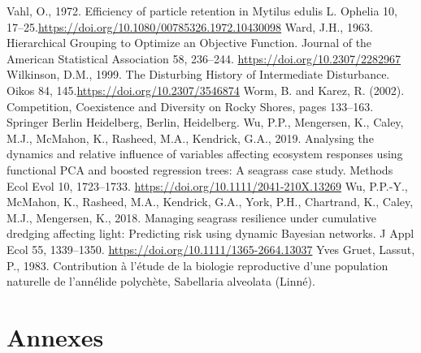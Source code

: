 \documentclass[12pt]{report}
\begin{document}
\begin{singlespacing}
\newline\newline
Vahl, O., 1972. Efficiency of particle retention in Mytilus edulis L. Ophelia 10, 17–25.\newline \href{https://doi.org/10.1080/00785326.1972.10430098}{https://doi.org/10.1080/00785326.1972.10430098}
\newline\newline
Ward, J.H., 1963. Hierarchical Grouping to Optimize an Objective Function. Journal of the American Statistical Association 58, 236–244. \href{https://doi.org/10.2307/2282967}{https://doi.org/10.2307/2282967}
\newline\newline
Wilkinson, D.M., 1999. The Disturbing History of Intermediate Disturbance. Oikos 84, 145.\newline \href{https://doi.org/10.2307/3546874}{https://doi.org/10.2307/3546874}
\newline\newline
Worm, B. and Karez, R. (2002). Competition, Coexistence and Diversity on Rocky Shores, pages 133–163. Springer Berlin Heidelberg, Berlin, Heidelberg.
\newline\newline
Wu, P.P., Mengersen, K., Caley, M.J., McMahon, K., Rasheed, M.A., Kendrick, G.A., 2019. Analysing the dynamics and relative influence of variables affecting ecosystem responses using functional PCA and boosted regression trees: A seagrass case study. Methods Ecol Evol 10, 1723–1733. \href{https://doi.org/10.1111/2041-210X.13269}{https://doi.org/10.1111/2041-210X.13269}
\newline\newline
Wu, P.P.-Y., McMahon, K., Rasheed, M.A., Kendrick, G.A., York, P.H., Chartrand, K., Caley, M.J., Mengersen, K., 2018. Managing seagrass resilience under cumulative dredging affecting light: Predicting risk using dynamic Bayesian networks. J Appl Ecol 55, 1339–1350. \newline
\href{https://doi.org/10.1111/1365-2664.13037}{https://doi.org/10.1111/1365-2664.13037}
\newline\newline
Yves Gruet, Lassut, P., 1983. Contribution à l’étude de la biologie reproductive d’une population naturelle de l’annélide polychète, Sabellaria alveolata (Linné).


\end{singlespacing}

\chapter{Annexes}
\end{document}
